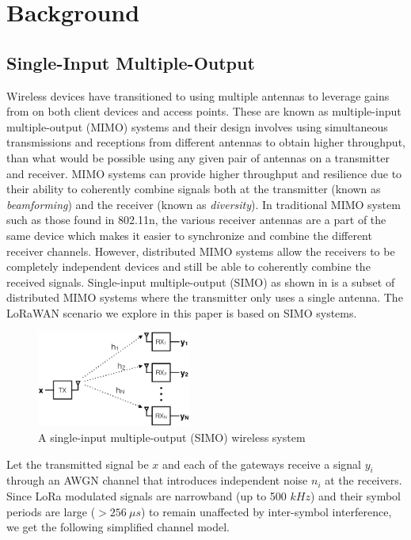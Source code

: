 \section{Background}
\label{sec:background}

\subsection{Single-Input Multiple-Output}
\label{sec:simo}

Wireless devices have transitioned to using multiple antennas to leverage
gains from on both client devices and access points. These are known as
multiple-input multiple-output (MIMO) systems and their design involves using
simultaneous transmissions and receptions from different antennas to obtain
higher throughput, than what would be possible using any given pair of
antennas on a transmitter and receiver. MIMO systems can provide higher
throughput and resilience due to their ability to coherently combine signals
both at the transmitter (known as \textit{beamforming}) and the receiver
(known as \textit{diversity}). In traditional MIMO system such as those found
in 802.11n, the various receiver antennas are a part of the same device which
makes it easier to synchronize and combine the different receiver channels.
However, distributed MIMO systems allow the receivers to be completely
independent devices and still be able to coherently combine the received
signals. Single-input multiple-output (SIMO) as shown in  is a
subset of distributed MIMO systems where the transmitter only uses a single
antenna. The LoRaWAN scenario we explore in this paper is based on SIMO
systems.

\begin{figure}[!htb]
    \centering
    \includegraphics[width=0.45\textwidth]{figures/SIMO_cropped}
    \caption{A single-input multiple-output (SIMO) wireless system}
    \label{fig:simo}
\end{figure}

Let the transmitted signal be $x$ and each of the gateways receive a signal
$y_i$ through an AWGN channel that introduces independent noise $n_i$ at the
receivers. Since LoRa modulated signals are narrowband (up to 500 $kHz$) and
their symbol periods are large ($> 256~\mu s$) to remain
unaffected by inter-symbol interference, we get the following simplified
channel model.

